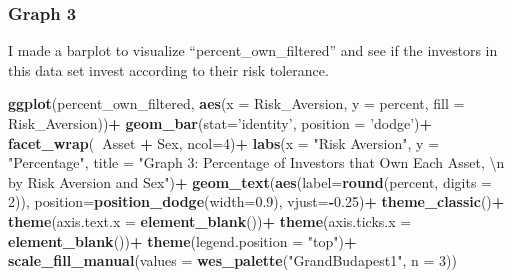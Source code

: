 \documentclass[
]{article}
\newenvironment{Shaded}{\begin{snugshade}}{\end{snugshade}}
\newcommand{\CharTok}[1]{\textcolor[rgb]{0.31,0.60,0.02}{#1}}
\newcommand{\DataTypeTok}[1]{\textcolor[rgb]{0.13,0.29,0.53}{#1}}
\newcommand{\DecValTok}[1]{\textcolor[rgb]{0.00,0.00,0.81}{#1}}
\newcommand{\FloatTok}[1]{\textcolor[rgb]{0.00,0.00,0.81}{#1}}
\newcommand{\KeywordTok}[1]{\textcolor[rgb]{0.13,0.29,0.53}{\textbf{#1}}}
\newcommand{\NormalTok}[1]{#1}
\newcommand{\OperatorTok}[1]{\textcolor[rgb]{0.81,0.36,0.00}{\textbf{#1}}}
\newcommand{\StringTok}[1]{\textcolor[rgb]{0.31,0.60,0.02}{#1}}
\begin{document}
\hypertarget{graph-3}{%
\subsubsection{Graph 3}\label{graph-3}}

I made a barplot to visualize ``percent\_own\_filtered'' and see if the
investors in this data set invest according to their risk tolerance.

\begin{Shaded}
\begin{Highlighting}[]
\KeywordTok{ggplot}\NormalTok{(percent_own_filtered, }\KeywordTok{aes}\NormalTok{(}\DataTypeTok{x =}\NormalTok{ Risk_Aversion, }\DataTypeTok{y =}\NormalTok{ percent, }\DataTypeTok{fill =}\NormalTok{ Risk_Aversion))}\OperatorTok{+}
\StringTok{  }\KeywordTok{geom_bar}\NormalTok{(}\DataTypeTok{stat=}\StringTok{'identity'}\NormalTok{, }\DataTypeTok{position =} \StringTok{'dodge'}\NormalTok{)}\OperatorTok{+}
\StringTok{  }\KeywordTok{facet_wrap}\NormalTok{(}\OperatorTok{~}\NormalTok{Asset }\OperatorTok{+}\StringTok{ }\NormalTok{Sex, }\DataTypeTok{ncol=}\DecValTok{4}\NormalTok{)}\OperatorTok{+}
\StringTok{  }\KeywordTok{labs}\NormalTok{(}\DataTypeTok{x =} \StringTok{"Risk Aversion"}\NormalTok{, }\DataTypeTok{y =} \StringTok{"Percentage"}\NormalTok{, }\DataTypeTok{title =} \StringTok{"Graph 3: Percentage of Investors that Own Each Asset, }\CharTok{\textbackslash{}n}\StringTok{ by Risk Aversion and Sex"}\NormalTok{)}\OperatorTok{+}
\StringTok{  }\KeywordTok{geom_text}\NormalTok{(}\KeywordTok{aes}\NormalTok{(}\DataTypeTok{label=}\KeywordTok{round}\NormalTok{(percent, }\DataTypeTok{digits =} \DecValTok{2}\NormalTok{)), }\DataTypeTok{position=}\KeywordTok{position_dodge}\NormalTok{(}\DataTypeTok{width=}\FloatTok{0.9}\NormalTok{), }\DataTypeTok{vjust=}\OperatorTok{-}\FloatTok{0.25}\NormalTok{)}\OperatorTok{+}
\StringTok{  }\KeywordTok{theme_classic}\NormalTok{()}\OperatorTok{+}
\StringTok{  }\KeywordTok{theme}\NormalTok{(}\DataTypeTok{axis.text.x =} \KeywordTok{element_blank}\NormalTok{())}\OperatorTok{+}\StringTok{ }
\StringTok{  }\KeywordTok{theme}\NormalTok{(}\DataTypeTok{axis.ticks.x =} \KeywordTok{element_blank}\NormalTok{())}\OperatorTok{+}
\StringTok{  }\KeywordTok{theme}\NormalTok{(}\DataTypeTok{legend.position =} \StringTok{"top"}\NormalTok{)}\OperatorTok{+}
\StringTok{  }\KeywordTok{scale_fill_manual}\NormalTok{(}\DataTypeTok{values =} \KeywordTok{wes_palette}\NormalTok{(}\StringTok{"GrandBudapest1"}\NormalTok{, }\DataTypeTok{n =} \DecValTok{3}\NormalTok{))}
\end{Highlighting}
\end{Shaded}
\end{document}
